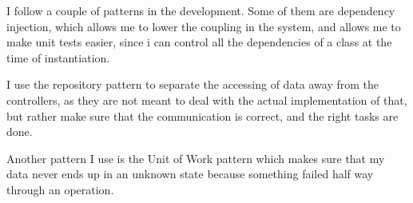 I follow a couple of patterns in the development. Some of them are dependency
injection, which allows me to lower the coupling in the system, and allows me
to make unit tests easier, since i can control all the dependencies of a class
at the time of instantiation.

I use the repository pattern to separate the accessing of data away from the
controllers, as they are not meant to deal with the actual implementation of
that, but rather make sure that the communication is correct, and the right
tasks are done.

Another pattern I use is the Unit of Work pattern which makes sure that my data
never ends up in an unknown state because something failed half way through an
operation. 
